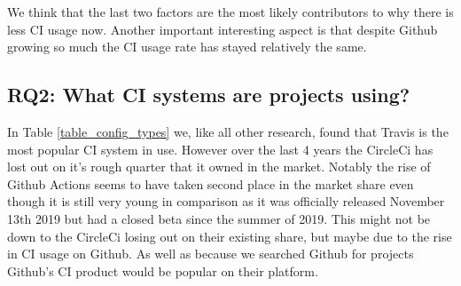 \documentclass[10pt,conference]{IEEEtran}
\begin{document}
We think that the last two factors are the most likely contributors to why there is less CI usage now. Another important interesting aspect is that despite Github growing so much the CI usage rate has stayed relatively the same. 




\vspace*{-0.05in}
\subsection{\textbf{RQ2}: What CI systems are projects using?}
\label{section:RQ2}
\vspace*{-0.05in}
In Table \ref{table_config_types} we, like all other research, found that Travis is the most popular CI system in use. However over the last 4 years the \cite{Github2017} CircleCi has lost out on it's rough quarter that it owned in the market. Notably the rise of Github Actions seems to have taken second place in the market share even though it is still very young in comparison as it was officially released November 13th 2019 but had a closed beta since the summer of 2019. This might not be down to the CircleCi losing out on their existing share, but maybe due to the rise in CI usage on Github. As well as because we searched Github for projects Github's CI product would be popular on their platform.


\end{document}
